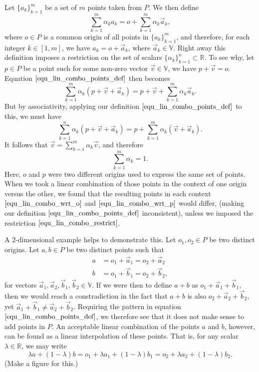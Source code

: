 \documentclass[12pt]{article}
\newcommand{\V}{\mathbb{V}}
\newcommand{\R}{\mathbb{R}}
\begin{document}
Let $\{a_k\}_{k=1}^m$ be a set of $m$ points taken from $P$.
We then define
\begin{equation}\label{equ_lin_combo_points_def}
\sum_{k=1}^m \alpha_k a_k = o + \sum_{k=1}^m \alpha_k\vec{a}_k,
\end{equation}
where $o\in P$ is a common origin of all points in $\{a_k\}_{k=1}^m$,
and therefore, for each integer $k\in[1,m]$, we have $a_k=o + \vec{a}_k$, where $\vec{a}_k\in\V$.
Right away this definition imposes a restriction on the set of scalars $\{\alpha_k\}_{k=1}^n\subset\R$.
To see why, let $p\in P$ be a point such for some non-zero vector $\vec{v}\in\V$, we have $p+\vec{v}=o$.
Equation $\eqref{equ_lin_combo_points_def}$ then becomes
\begin{equation}\label{equ_lin_combo_wrt_o}
\sum_{k=1}^m \alpha_k(p+\vec{v}+\vec{a}_k) = p+\vec{v}+\sum_{k=1}^m\alpha_k\vec{a}_k.
\end{equation}
But by associativity, applying our definition $\eqref{equ_lin_combo_points_def}$ to this, we must have
\begin{equation}\label{equ_lin_combo_wrt_p}
\sum_{k=1}^n \alpha_k(p+\vec{v}+\vec{a}_k) = p+\sum_{k=1}^m \alpha_k(\vec{v}+\vec{a}_k).
\end{equation}
It follows that $\vec{v} = \sum_{k=1}^m\alpha_k\vec{v}$, and therefore
\begin{equation}\label{equ_lin_combo_restrict}
\sum_{k=1}^m\alpha_k = 1.
\end{equation}
Here, $o$ and $p$ were two different origins used to express the same
set of points.  When we took a linear combination of those points in
the context of one origin versus the other, we found that the resulting
points in each context $\eqref{equ_lin_combo_wrt_o}$ and $\eqref{equ_lin_combo_wrt_p}$
would differ, (making our definition $\eqref{equ_lin_combo_points_def}$
inconsistent), unless we imposed the restriction $\eqref{equ_lin_combo_restrict}$.

A 2-dimensional example helps to demonstrate this.  Let $o_1,o_2\in P$ be two
distinct origins.  Let $a,b\in P$ be two distinct points such that
\begin{align*}
a&=o_1+\vec{a}_1=o_2+\vec{a}_2 \\
b&=o_1+\vec{b}_1=o_2+\vec{b}_2,
\end{align*}
for vectors $\vec{a}_1,\vec{a}_2,\vec{b}_1,\vec{b}_2\in\V$.  If we were then to define $a+b$ as
$o_1+\vec{a}_1+\vec{b}_1$,
then we would reach a constradiction in the fact that $a+b$ is also
$o_2+\vec{a}_2+\vec{b}_2$, yet $\vec{a}_1+\vec{b}_1\neq \vec{a}_2+\vec{b}_2$.
Requiring the pattern in equation $\eqref{equ_lin_combo_points_def}$, we therefore see that it does not make
sense to add points in $P$.  An acceptable linear combination of the points $a$ and $b$, however,
can be found as a linear interpolation of these points.  That is, for any scalar $\lambda\in\R$,
we may write
\begin{equation*}
\lambda a+(1-\lambda)b = o_1 + \lambda a_1+(1-\lambda)b_1 = o_2+\lambda a_2+(1-\lambda )b_2.
\end{equation*}
(Make a figure for this.)
\end{document}
